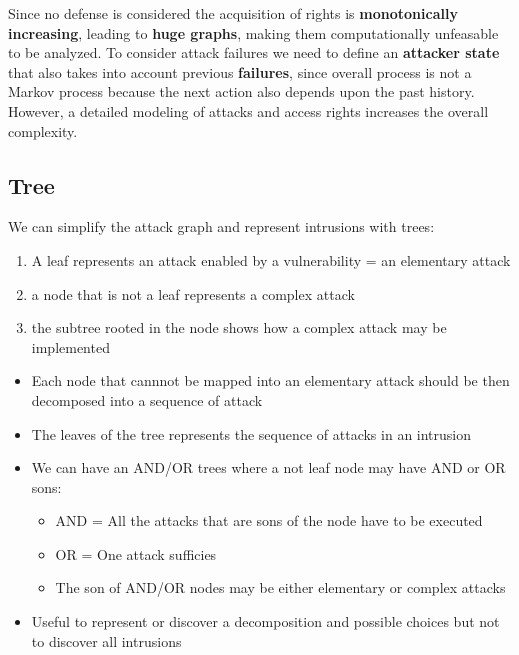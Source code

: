 Since no defense is considered the acquisition of rights is \textbf{monotonically increasing},
leading to \textbf{huge graphs}, making them computationally unfeasable to be analyzed.
To consider attack failures we need to define an \textbf{attacker state} that also takes into account previous \textbf{failures},
since overall process is not a Markov process because the next action also
depends upon the past history.
However, a detailed modeling of attacks and access rights increases the overall complexity.

\subsection{Tree}

We can simplify the attack graph and represent intrusions with trees:
\begin{enumerate}
   \item A leaf represents an attack enabled by a vulnerability = an elementary attack
   \item a node that is not a leaf represents a complex attack
   \item the subtree rooted in the node shows how a complex attack may be implemented
\end{enumerate}

\begin{itemize}
   \item Each node that cannnot be mapped into an elementary attack should be then
   decomposed into a sequence of attack
   \item The leaves of the tree represents the sequence of attacks in an intrusion
   \item We can have an AND/OR trees where a not leaf node may have AND or OR sons:
   \begin{itemize}
      \item AND = All the attacks that are sons of the node have to be executed
      \item OR = One attack sufficies
      \item The son of AND/OR nodes may be either elementary or complex attacks
   \end{itemize}
   \item Useful to represent or discover a decomposition and possible choices but not to
   discover all intrusions
\end{itemize}


